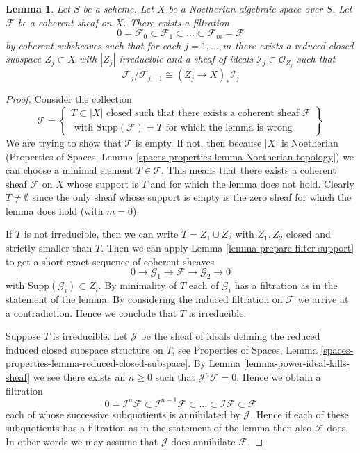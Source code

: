 \documentclass{stacks-project}
\theoremstyle{plain}
\newtheorem{lemma}[subsection]{Lemma}
\theoremstyle{definition}
\theoremstyle{remark}
\numberwithin{equation}{subsection}
\begin{document}
\begin{lemma}
\label{lemma-coherent-filter}
Let $S$ be a scheme. Let $X$ be a Noetherian algebraic space over $S$.
Let $\mathcal{F}$ be a coherent sheaf on $X$. There exists a filtration
$$
0 = \mathcal{F}_0 \subset \mathcal{F}_1 \subset
\ldots \subset \mathcal{F}_m = \mathcal{F}
$$
by coherent subsheaves such that for each $j = 1, \ldots, m$
there exists a reduced closed subspace $Z_j \subset X$ with $|Z_j|$
irreducible and a sheaf of ideals $\mathcal{I}_j \subset \mathcal{O}_{Z_j}$
such that
$$
\mathcal{F}_j/\mathcal{F}_{j - 1}
\cong (Z_j \to X)_* \mathcal{I}_j
$$
\end{lemma}

\begin{proof}
Consider the collection
$$
\mathcal{T} =
\left\{
\begin{matrix}
T \subset |X|
\text{ closed such that there exists a coherent sheaf }
\mathcal{F} \\
\text{ with }
\text{Supp}(\mathcal{F}) = T
\text{ for which the lemma is wrong}
\end{matrix}
\right\}
$$
We are trying to show that $\mathcal{T}$ is empty. If not, then
because $|X|$ is Noetherian (Properties of Spaces, Lemma
\ref{spaces-properties-lemma-Noetherian-topology})
we can choose a minimal element $T \in \mathcal{T}$. This means that
there exists a coherent sheaf $\mathcal{F}$ on $X$ whose support is $T$
and for which the lemma does not hold. Clearly $T \not = \emptyset$ since
the only sheaf whose support is empty is the zero sheaf for which the
lemma does hold (with $m = 0$).

\medskip\noindent
If $T$ is not irreducible, then we can write $T = Z_1 \cup Z_2$
with $Z_1, Z_2$ closed and strictly smaller than $T$.
Then we can apply Lemma \ref{lemma-prepare-filter-support}
to get a short exact sequence of coherent sheaves
$$
0 \to
\mathcal{G}_1 \to
\mathcal{F} \to
\mathcal{G}_2 \to 0
$$
with $\text{Supp}(\mathcal{G}_i) \subset Z_i$. By minimality of
$T$ each of $\mathcal{G}_i$ has a filtration as in the statement
of the lemma. By considering the induced filtration on $\mathcal{F}$
we arrive at a contradiction. Hence we conclude
that $T$ is irreducible.

\medskip\noindent
Suppose $T$ is irreducible. Let $\mathcal{J}$ be the sheaf of ideals
defining the reduced induced closed subspace structure on $T$,
see Properties of Spaces, Lemma
\ref{spaces-properties-lemma-reduced-closed-subspace}.
By Lemma \ref{lemma-power-ideal-kills-sheaf} we see there exists
an $n \geq 0$ such that $\mathcal{J}^n\mathcal{F} = 0$. Hence we obtain
a filtration
$$
0 = \mathcal{I}^n\mathcal{F} \subset \mathcal{I}^{n - 1}\mathcal{F}
\subset \ldots \subset \mathcal{I}\mathcal{F} \subset \mathcal{F}
$$
each of whose successive subquotients is annihilated by $\mathcal{J}$.
Hence if each of these subquotients has a filtration as in the statement
of the lemma then also $\mathcal{F}$ does. In other words we may
assume that $\mathcal{J}$ does annihilate $\mathcal{F}$.


\end{proof}
\end{document}
